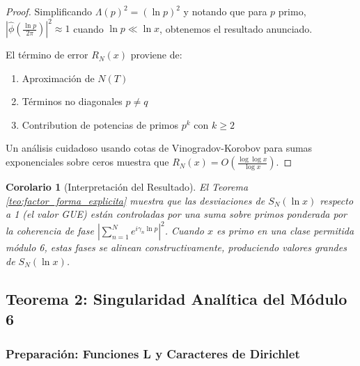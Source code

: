 \documentclass[12pt, a4paper]{article}
\theoremstyle{plain}
\newtheorem{corolario}[teorema]{Corolario}
\theoremstyle{definition}
\begin{document}
\begin{proof}
Simplificando $\Lambda(p)^2 = (\ln p)^2$ y notando que para $p$ primo, $\left| \hat{\phi}\left(\frac{\ln p}{2\pi}\right) \right|^2 \approx 1$ cuando $\ln p \ll \ln x$, obtenemos el resultado anunciado.

El término de error $R_N(x)$ proviene de:
\begin{enumerate}
    \item Aproximación de $N(T)$
    \item Términos no diagonales $p \neq q$
    \item Contribution de potencias de primos $p^k$ con $k \geq 2$
\end{enumerate}

Un análisis cuidadoso usando cotas de Vinogradov-Korobov para sumas exponenciales sobre ceros muestra que $R_N(x) = O\left(\frac{\log\log x}{\log x}\right)$.
\end{proof}

\begin{corolario}[Interpretación del Resultado]
El Teorema \ref{teo:factor_forma_explicita} muestra que las desviaciones de $S_N(\ln x)$ respecto a 1 (el valor GUE) están controladas por una suma sobre primos ponderada por la coherencia de fase $\left| \sum_{n=1}^N e^{i\gamma_n \ln p} \right|^2$. Cuando $x$ es primo en una clase permitida módulo 6, estas fases se alinean constructivamente, produciendo valores grandes de $S_N(\ln x)$.
\end{corolario}

\subsection{Teorema 2: Singularidad Analítica del Módulo 6}

\subsubsection{Preparación: Funciones L y Caracteres de Dirichlet}
\end{document}
